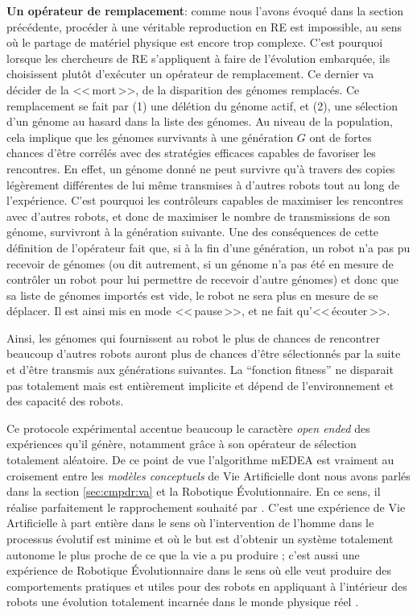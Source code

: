 \textbf{Un opérateur de remplacement}: comme nous l'avons évoqué dans la section précédente, procéder à une véritable reproduction en RE est impossible, au sens où le partage de matériel physique est encore trop complexe. C'est pourquoi lorsque les chercheurs de RE s'appliquent à faire de l'évolution embarquée, ils choisissent plutôt d'exécuter un opérateur de remplacement. Ce dernier va décider de la <<\,mort\,>>, de la disparition des génomes remplacés. Ce remplacement se fait par (1) une délétion du génome actif, et (2), une sélection d'un génome au hasard dans la liste des génomes. Au niveau de la population, cela implique que les génomes survivants à une génération $G$ ont de fortes chances d'être corrélés avec des stratégies efficaces capables de favoriser les rencontres. En effet, un génome donné ne peut survivre qu'à travers des copies légèrement différentes de lui même transmises à d'autres robots tout au long de l'expérience. C'est pourquoi les contrôleurs capables de maximiser les rencontres avec d'autres robots, et donc de maximiser le nombre de transmissions de son génome, survivront à la génération suivante. Une des conséquences de cette définition de l'opérateur fait que, si à la fin d'une génération, un robot n'a pas pu recevoir de génomes (ou dit autrement, si un génome n'a pas été en mesure de contrôler un robot pour lui permettre de recevoir d'autre génomes) et donc que sa liste de génomes importés est vide, le robot ne sera plus en mesure de se déplacer. Il est ainsi mis en mode <<\,pause\,>>, et ne fait qu'<<\,écouter\,>>.

Ainsi, les génomes qui fournissent au robot le plus de chances de rencontrer beaucoup d'autres robots auront plus de chances d'être sélectionnés par la suite et d'être transmis aux générations suivantes. La ``fonction fitness'' ne disparait pas totalement mais est entièrement implicite et dépend de l'environnement et des capacité des robots.

Ce protocole expérimental accentue beaucoup le caractère \emph{open ended} des expériences qu'il génère, notamment grâce à son opérateur de sélection totalement aléatoire. De ce point de vue l'algorithme mEDEA est vraiment au croisement entre les \emph{modèles conceptuels} de Vie Artificielle dont nous avons parlés dans la section \ref{sec:cmpdr:va} et la Robotique \'Evolutionnaire. En ce sens, il réalise parfaitement le rapprochement souhaité par \cite{watson02embodiedevolutiondistributingevolutionaryalgorithmpopulationrobots}. C'est une expérience de Vie Artificielle à part entière dans le sens où l'intervention de l'homme dans le processus évolutif est minime et où le but est d'obtenir un système totalement autonome le plus proche de ce que la vie a pu produire ;  c'est aussi une expérience de Robotique \'Evolutionnaire dans le sens où elle veut produire des comportements pratiques et utiles pour des robots en appliquant à l'intérieur des robots une évolution totalement incarnée dans le monde physique réel .

